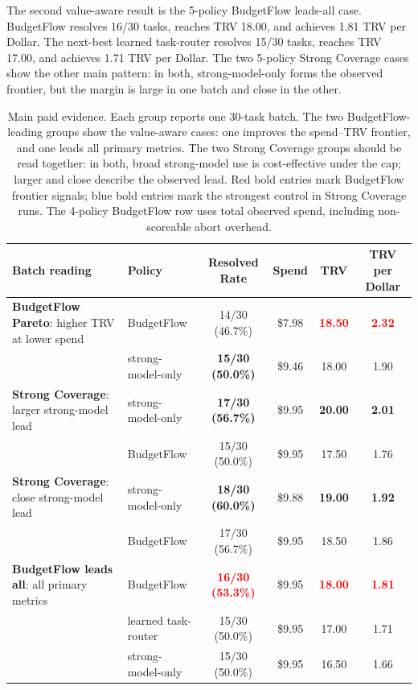 \documentclass{article}
\newcommand{\method}{BudgetFlow\xspace}
\newcommand{\trv}{TRV\xspace}
\newcommand{\pos}[1]{\textcolor{red}{\textbf{#1}}}
\newcommand{\ctrl}[1]{\textcolor{bfblue}{\textbf{#1}}}
\begin{document}
The second value-aware result is the 5-policy BudgetFlow leads-all case. \method resolves 16/30 tasks, reaches \trv 18.00, and achieves 1.81 \trv per Dollar. The next-best learned task-router resolves 15/30 tasks, reaches \trv 17.00, and achieves 1.71 \trv per Dollar. The two 5-policy Strong Coverage cases show the other main pattern: in both, strong-model-only forms the observed frontier, but the margin is large in one batch and close in the other.

\begin{table}[t]
\centering
\small
\begin{tabular}{@{}>{\raggedright\arraybackslash}p{}lcccc@{}}
\toprule
Batch reading & Policy & Resolved Rate & Spend & TRV & TRV per Dollar \\
\midrule
\textbf{BudgetFlow Pareto}: higher \trv at lower spend & \method & 14/30 (46.7\%) & \$7.98 & \pos{18.50} & \pos{2.32} \\
 & strong-model-only & \ctrl{15/30 (50.0\%)} & \$9.46 & 18.00 & 1.90 \\
\addlinespace
\textbf{Strong Coverage}: larger strong-model lead & strong-model-only & \ctrl{17/30 (56.7\%)} & \$9.95 & \ctrl{20.00} & \ctrl{2.01} \\
 & \method & 15/30 (50.0\%) & \$9.95 & 17.50 & 1.76 \\
\addlinespace
\textbf{Strong Coverage}: close strong-model lead & strong-model-only & \ctrl{18/30 (60.0\%)} & \$9.88 & \ctrl{19.00} & \ctrl{1.92} \\
 & \method & 17/30 (56.7\%) & \$9.95 & 18.50 & 1.86 \\
\addlinespace
\textbf{BudgetFlow leads all}: all primary metrics & \method & \pos{16/30 (53.3\%)} & \$9.95 & \pos{18.00} & \pos{1.81} \\
 & learned task-router & 15/30 (50.0\%) & \$9.95 & 17.00 & 1.71 \\
 & strong-model-only & 15/30 (50.0\%) & \$9.95 & 16.50 & 1.66 \\
\bottomrule
\end{tabular}
\caption{Main paid evidence. Each group reports one 30-task batch. The two BudgetFlow-leading groups show the value-aware cases: one improves the spend--\trv frontier, and one leads all primary metrics. The two Strong Coverage groups should be read together: in both, broad strong-model use is cost-effective under the cap; larger and close describe the observed lead. Red bold entries mark BudgetFlow frontier signals; blue bold entries mark the strongest control in Strong Coverage runs. The 4-policy BudgetFlow row uses total observed spend, including non-scoreable abort overhead.}
\label{tab:main-evidence}
\end{table}
\end{document}
